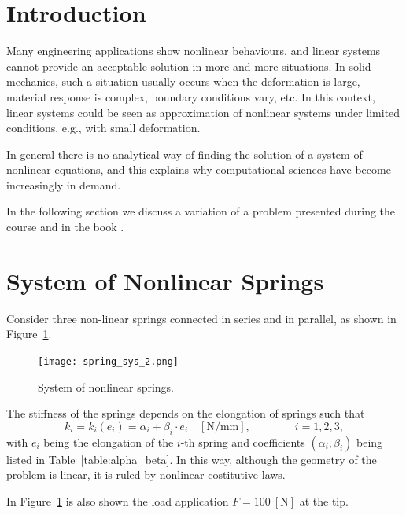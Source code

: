 
\section{Introduction}
\label{sec:introduction1}%

Many engineering applications show nonlinear behaviours, and linear systems cannot provide an acceptable solution in more and more situations. In solid mechanics, such a situation usually occurs when the deformation is large, material response is complex, boundary conditions vary, etc. In this context, linear systems could be seen as approximation of nonlinear systems under limited conditions, e.g., with small deformation.

In general there is no analytical way of finding the solution of a system of nonlinear equations, and this explains why computational sciences have become increasingly in demand.

In the following section we discuss a variation of a problem presented during the course and in the book \cite{namhokim}.

\section{System of Nonlinear Springs}
\label{sec:system_NL_springs}%

Consider three non-linear springs connected in series and in parallel, as shown in Figure~\ref{fig:springs_first}.

\begin{figure}[H]
    \centering
    \texttt{[image: spring\_sys\_2.png]}
    \caption{System of nonlinear springs.}
    \label{fig:springs_first}
\end{figure}

The stiffness of the springs depends on the elongation of springs such that
\begin{equation}
\label{eq:spring_1}
k_i = k_i\left( e_i \right) = \alpha_i+\beta_i\cdot e_i\quad [\text{N/mm}],\qquad\qquad i=1,2,3,
\end{equation}
with $e_i$ being the elongation of the $i$-th spring and coefficients $\left( \alpha_i,\beta_i \right)$ being listed in Table~\ref{table:alpha_beta}. In this way, although the geometry of the problem is linear, it is ruled by nonlinear costitutive laws.

In Figure~\ref{fig:springs_first} is also shown the load application $F=100\ [\text{N}]$ at the tip.

